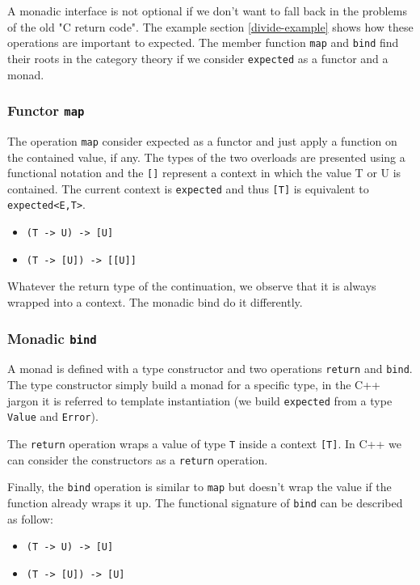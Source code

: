 \documentclass[a4paper,10pt]{article}
\newcommand{\cpp}[1]{\lstinline{#1}}
\begin{document}
A monadic interface is not optional if we don't want to fall back in the problems of the old "C return code". The example section \ref{divide-example} shows how these operations are important to expected. The member function \cpp{map} and \cpp{bind} find their roots in the category theory if we consider \cpp{expected} as a functor and a monad.

\subsubsection{Functor \cpp{map}}

The operation \cpp{map} consider expected as a functor and just apply a function on the contained value, if any. The types of the two overloads are presented using a functional notation and the \cpp{[]} represent a context in which the value T or U is contained. The current context is \cpp{expected} and thus \cpp{[T]} is equivalent to \cpp{expected<E,T>}.

\begin{itemize}
\item \cpp{(T -> U) -> [U]}
\item \cpp{(T -> [U]) -> [[U]]}
\end{itemize}

Whatever the return type of the continuation, we observe that it is always wrapped into a context. The monadic bind do it differently.

\subsubsection{Monadic \cpp{bind}}

A monad is defined with a type constructor and two operations \cpp{return} and \cpp{bind}. The type constructor simply build a monad for a specific type, in the C++ jargon it is referred to template instantiation (we build \cpp{expected} from a type \cpp{Value} and \cpp{Error}).

The \cpp{return} operation wraps a value of type \cpp{T} inside a context \cpp{[T]}. In C++ we can consider the constructors as a \cpp{return} operation.

Finally, the \cpp{bind} operation is similar to \cpp{map} but doesn't wrap the value if the function already wraps it up. The functional signature of \cpp{bind} can be described as follow:

\begin{itemize}
\item \cpp{(T -> U) -> [U]}
\item \cpp{(T -> [U]) -> [U]}
\end{itemize}
\end{document}
